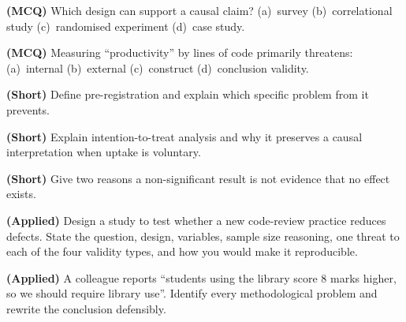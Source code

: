 \begin{reviewq}
  \item \textbf{(MCQ)} Which design can support a causal claim? (a)~survey
        (b)~correlational study (c)~randomised experiment (d)~case study.
  \item \textbf{(MCQ)} Measuring ``productivity'' by lines of code primarily
        threatens: (a)~internal (b)~external (c)~construct (d)~conclusion validity.
  \item \textbf{(Short)} Define pre-registration and explain which specific problem
        from  it prevents.
  \item \textbf{(Short)} Explain intention-to-treat analysis and why it preserves a
        causal interpretation when uptake is voluntary.
  \item \textbf{(Short)} Give two reasons a non-significant result is not evidence
        that no effect exists.
  \item \textbf{(Applied)} Design a study to test whether a new code-review practice
        reduces defects. State the question, design, variables, sample size
        reasoning, one threat to each of the four validity types, and how you would
        make it reproducible.
  \item \textbf{(Applied)} A colleague reports ``students using the library score
        8 marks higher, so we should require library use''. Identify every
        methodological problem and rewrite the conclusion defensibly.
\end{reviewq}
